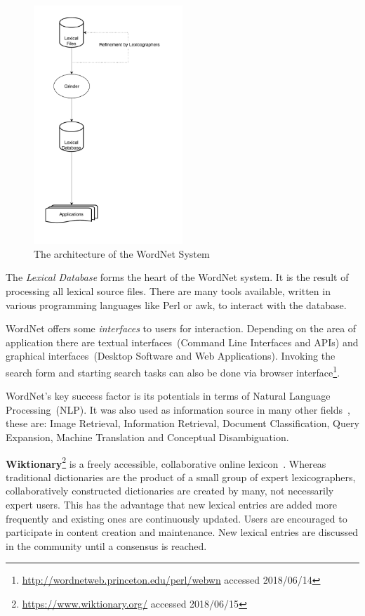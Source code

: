 \begin{figure}
	 \centering
	 \includegraphics[width=0.5\textwidth]{drawio/WordNet_Architecture}
	 \caption{The architecture of the WordNet System~\cite{fellbaum1998}}\label{fig:wordnet_architecture}
\end{figure}


The \textit{Lexical Database} forms the heart of the WordNet system. It is the result of processing all lexical source files. There are many tools available, written in various programming languages like Perl or awk, to interact with the database. 

WordNet offers some \textit{interfaces} to users for interaction. Depending on the area of application there are textual interfaces~(Command Line Interfaces and APIs) and graphical interfaces~(Desktop Software and Web Applications). Invoking the search form and starting search tasks can also be done via browser interface\footnote{\url{http://wordnetweb.princeton.edu/perl/webwn} accessed 2018/06/14}.

WordNet's key success factor is its potentials in terms of Natural Language Processing~(NLP). It was also used as information source in many other fields~\cite{morato2004}, these are: Image Retrieval, Information Retrieval, Document Classification, Query Expansion, Machine Translation and Conceptual Disambiguation.


\textbf{Wiktionary}\footnote{\url{https://www.wiktionary.org/} accessed 2018/06/15} is a freely accessible, collaborative online lexicon~\cite{granger2012}. Whereas traditional dictionaries are the product of a small group of expert lexicographers, collaboratively constructed dictionaries are created by many, not necessarily expert users. This has the advantage that new lexical entries are added more frequently and existing ones are continuously updated. Users are encouraged to participate in content creation and maintenance. New lexical entries are discussed in the community until a consensus is reached. 

